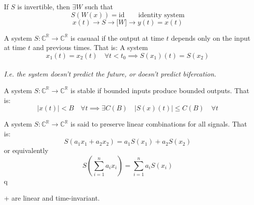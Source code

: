 \begin{corollary}
    []
    If $S$ is invertible, then $\exists W$ such that
    $$S(W(x)) = \text{id} \qquad \text{identity system}$$
    $$x(t) \to \boxed{S} \to \boxed[W] \to y(t) = x(t)$$
\end{corollary}

\begin{definition}
    A system $S : \mathbb{C}^{\mathbb{R}} \to \mathbb{C}^{\mathbb{R}}$ is casuaal if the output at time $t$ depends only on the input at time $t$ and previous times. That is:
    A system
    $$        x_1(t) = x_2(t) \quad \forall t < t_0 \implies S(x_1)(t) = S(x_2)$$
    \\\textit{I.e. the system doesn't predict the future, or doesn't predict bifercation.}
\end{definition}

\begin{definition}
    A system $S : \mathbb{C}^{\mathbb{R}} \to \mathbb{C}^{\mathbb{R}}$ is stable if bounded inputs produce bounded outputs. That is:
    $$|x(t)| < B \quad \forall t \implies \exists C(B) \quad |S(x)(t)| \leq C(B) \quad \forall t$$
\end{definition}

\begin{definition}
    A system $S : \mathbb{C}^{\mathbb{R}} \to \mathbb{C}^{\mathbb{R}}$ is said to preserve linear combinations for all signals. That is:
    $$S(a_1 x_1 + a_2 x_2) = a_1 S(x_1) + a_2 S(x_2)$$
    or equivalently
    $$S(\sum_{i=1}^{n} a_i x_i) = \sum_{i=1}^{n} a_i S(x_i)$$q
\end{definition}

\begin{theorem}
    +
    are linear and time-invariant.
\end{theorem}